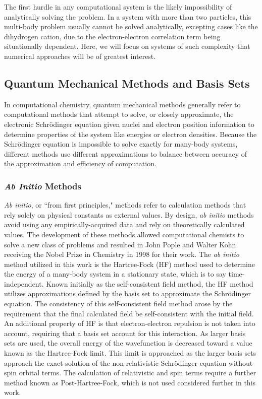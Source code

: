 The first hurdle in any computational system is the likely impossibility of analytically solving the problem. 
In a system with more than two particles, this multi-body problem usually cannot be solved analytically, excepting cases like the dihydrogen cation, due to the electron-electron correlation term being situationally dependent.\cite{ManyBody}
Here, we will focus on systems of such complexity that numerical approaches will be of greatest interest.

\subsection{Quantum Mechanical Methods and Basis Sets}

In computational chemistry, quantum mechanical methods generally refer to computational methods that attempt to solve, or closely approximate, the electronic Schr\"{o}dinger equation given nuclei and electron position information to determine properties of the system like energies or electron densities.
Because the Schr\"{o}dinger equation is impossible to solve exactly for many-body systems, different methods use different approximations to balance between accuracy of the approximation and efficiency of computation.

\subsubsection{\textit{Ab Initio} Methods}

\textit{Ab initio}, or ``from first principles," methods refer to calculation methods that rely solely on physical constants as external values.
By design, \textit{ab initio} methods avoid using any empirically-acquired data and rely on theoretically calculated values.
The development of these methods allowed computational chemists to solve a new class of problems and resulted in John Pople and Walter Kohn receiving the Nobel Prize in Chemistry in 1998 for their work.
The \textit{ab initio} method utilized in this work is the Hartree-Fock (HF) method used to determine the energy of a many-body system in a stationary state, which is to say time-independent.\cite{hartree_1928}
Known initially as the self-consistent field method, the HF method utilizes approximations defined by the basis set to approximate the Schr\"{o}dinger equation. 
The consistency of this self-consistent field method arose by the requirement that the final calculated field be self-consistent with the initial field.
An additional property of HF is that electron-electron repulsion is not taken into account, requiring that a basis set account for this interaction.
As larger basis sets are used, the overall energy of the wavefunction is decreased toward a value known as the Hartree-Fock limit.
This limit is approached as the larger basis sets approach the exact solution of the non-relativistic Schr\"{o}dinger equation without spin orbital terms.
The calculation of relativistic and spin terms require a further method known as Post-Hartree-Fock, which is not used considered further in this work.

